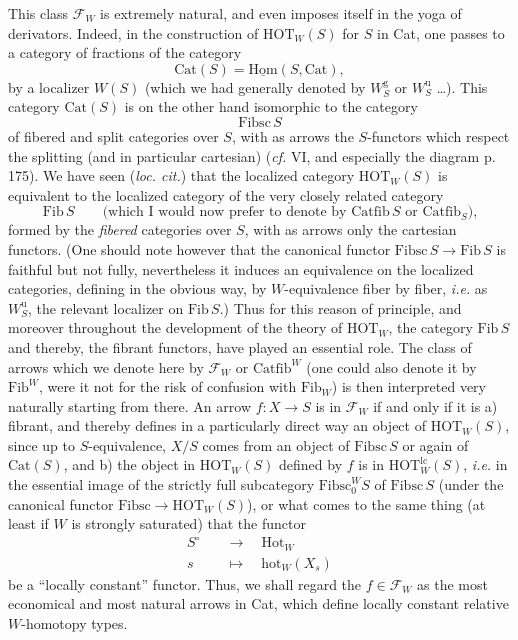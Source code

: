 \documentclass[11pt]{article}
\newcommand{\printedpage}[1]{\marginpar{\footnotesize p.~#1}}
\newcommand{\msp}[1]{\marginpar{\footnotesize [#1]}}
\newcommand{\Fib}{\mathrm{Fib}}
\newcommand{\Catfib}{\mathrm{Catfib}}
\newcommand{\Fibsc}{\mathrm{Fibsc}}
\newcommand{\Cat}{\mathrm{Cat}}
\newcommand{\HOT}{\mathrm{HOT}}
\begin{document}
\msp{page 33}

This class $\mathcal{F}_W$ is extremely natural, and even imposes itself in the yoga of derivators. Indeed, in the construction of $\HOT_W(S)$ for $S$ in Cat, one passes to a category of fractions of the category
\[
\Cat(S) = \underline{\mathrm{Hom}}(S, \Cat),
\]
by a localizer $W(S)$ (which we had generally denoted by $W_S^{\mathrm{g}}$ or $W_S^{\mathrm{u}}$ \ldots). This category $\Cat(S)$ is on the other hand isomorphic to the category
\[
\Fibsc\, S
\]
of fibered and split categories over $S$, with as arrows the $S$-functors which respect the splitting (and in particular cartesian) (\textit{cf.} VI, and especially the diagram p. 175). We have seen (\textit{loc. cit.}) that the localized category $\HOT_W(S)$ is equivalent to the localized category of the very closely related category
\[
\Fib\, S \qquad \text{(which I would now prefer to denote by $\Catfib\, S$ or $\Catfib_S$),}
\]
formed by the \textit{fibered} categories over $S$, with as \msp{page 34} arrows only the cartesian functors. (One should note however that the canonical functor $\Fibsc\, S \longrightarrow \Fib\, S$ is faithful but not fully, nevertheless it induces an equivalence on the localized categories, defining in the obvious way, by $W$-equivalence fiber by fiber, \textit{i.e.} as $W_S^{\mathrm{u}}$, the relevant localizer on $\Fib\, S$.) Thus for this reason of principle, and moreover throughout the development of the theory of $\HOT_W$, the category $\Fib\, S$ and thereby, the fibrant functors, have played an essential role. The class of arrows which we denote here by $\mathcal{F}_W$ or $\Catfib^W$ (one could also denote it by $\Fib^W$, were it not for the risk of confusion with $\Fib_W$) is then interpreted very naturally starting from there. An arrow $f : X \longrightarrow S$ is in $\mathcal{F}_W$ if and only if it is a) fibrant, and thereby defines in a particularly direct way an object of $\HOT_W(S)$, since up to $S$-equivalence, $X/S$ comes from an object of $\Fibsc\, S$ or again of $\Cat(S)$, \msp{page 35} and b) the object in $\HOT_W(S)$ defined by $f$ is in $\HOT_W^{\mathrm{lc}}(S)$, \textit{i.e.} in the essential image of the strictly full subcategory $\Fibsc_0^W S$ of $\Fibsc\, S$ (under the canonical functor
\printedpage{22}
$\Fibsc \longrightarrow \HOT_W(S)$), or what comes to the same thing (at least if $W$ is strongly saturated) that the functor %
\[
\begin{aligned}
S^{\circ} \quad &\longrightarrow \quad \mathrm{Hot}_W \\
s \quad &\longmapsto \quad \mathrm{hot}_W(X_s)
\end{aligned}
\]
be a ``locally constant'' functor. Thus, we shall regard the $f \in \mathcal{F}_W$ as the most economical and most natural arrows in Cat, which define locally constant relative $W$-homotopy types.
\end{document}
